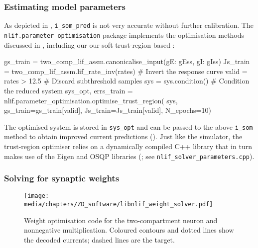 \subsubsection{Estimating model parameters}
As depicted in , \texttt{i\_som\_pred} is not very accurate without further calibration.
The \texttt{nlif.parameter\_optimisation} package implements the optimisation methods discussed in , including our 
our soft trust-region based \SQP:
\begin{pythoncode}
gs_train = two_comp_lif_assm.canonicalise_input({gE: gEss, gI: gIss})
Js_train = two_comp_lif_assm.lif_rate_inv(rates) # Invert the response curve
valid = rates > 12.5                             # Discard subthreshold samples
sys = sys.condition()                            # Condition the reduced system
sys_opt, errs_train = nlif.parameter_optimisation.optimise_trust_region(
	sys, gs_train=gs_train[valid], Js_train=Js_train[valid], N_epochs=10)
\end{pythoncode}
The optimised system is stored in \texttt{sys\_opt} and can be passed to the above \texttt{i\_som} method to obtain improved current predictions ().
Just like the \nlif simulator, the trust-region optimiser relies on a dynamically compiled C++ library that in turn makes use of the Eigen and OSQP libraries (\cite{stellato2020osqp}; see \texttt{nlif\_solver\_parameters.cpp}).

\subsubsection{Solving for synaptic weights}

\begin{figure}
	\texttt{[image: media/chapters/ZD\_software/libnlif\_weight\_solver.pdf]}
	\caption[eight optimisation code for the two-compartment neuron and nonnegative multiplication]{Weight optimisation code for the two-compartment neuron and nonnegative multiplication. Coloured contours and dotted lines show the decoded currents; dashed lines are the target.}
\end{figure}

